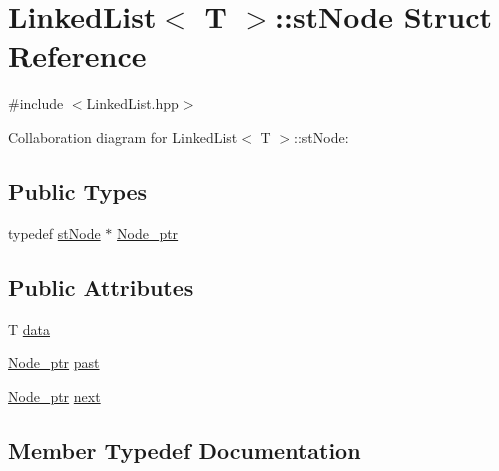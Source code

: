 \hypertarget{struct_linked_list_1_1st_node}{}\section{Linked\+List$<$ T $>$\+:\+:st\+Node Struct Reference}
\label{struct_linked_list_1_1st_node}


{\ttfamily \#include $<$Linked\+List.\+hpp$>$}



Collaboration diagram for Linked\+List$<$ T $>$\+:\+:st\+Node\+:
\subsection*{Public Types}
\begin{DoxyCompactItemize}
\item 
typedef \hyperlink{struct_linked_list_1_1st_node}{st\+Node} $\ast$ \hyperlink{struct_linked_list_1_1st_node_a278875c2a2b254131663e0e3e5e8acd1}{Node\+\_\+ptr}
\end{DoxyCompactItemize}
\subsection*{Public Attributes}
\begin{DoxyCompactItemize}
\item 
T \hyperlink{struct_linked_list_1_1st_node_a3d05f857dd38ee6169bf6e439be75aa9}{data}
\item 
\hyperlink{struct_linked_list_1_1st_node_a278875c2a2b254131663e0e3e5e8acd1}{Node\+\_\+ptr} \hyperlink{struct_linked_list_1_1st_node_afc151ad2c6e60bb7ea299bcd1aabcf73}{past}
\item 
\hyperlink{struct_linked_list_1_1st_node_a278875c2a2b254131663e0e3e5e8acd1}{Node\+\_\+ptr} \hyperlink{struct_linked_list_1_1st_node_afc9002d9d8db58e40ee1e56767c0afd4}{next}
\end{DoxyCompactItemize}


\subsection{Member Typedef Documentation}
\mbox{\label{struct_linked_list_1_1st_node_a278875c2a2b254131663e0e3e5e8acd1}} 
